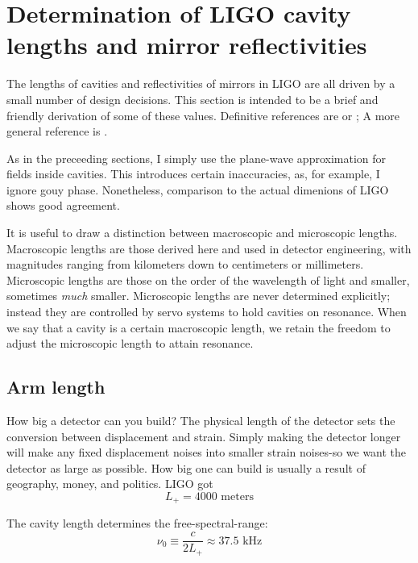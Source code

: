 
\section{Determination of LIGO cavity lengths and mirror reflectivities}

The lengths of cavities and reflectivities of mirrors in LIGO are all
driven by a small number of design decisions.  This section is
intended to be a brief and friendly derivation of some of these
values.  Definitive references are \cite{LigoFreqResponse97} or
\cite{Fritschel2001Readout}; A more general reference is
\cite{S5InstrumentPaper}.

As in the preceeding sections, I simply use the plane-wave
approximation for fields inside cavities. This introduces certain
inaccuracies, as, for example, I ignore gouy phase. Nonetheless,
comparison to the actual dimenions of LIGO shows good agreement.

It is useful to draw a distinction between macroscopic and microscopic
lengths. Macroscopic lengths are those derived here and
used in detector engineering, with magnitudes ranging from kilometers
down to centimeters or millimeters. Microscopic lengths are those
on the order of the wavelength of light and smaller, sometimes \emph{much}
smaller. Microscopic lengths are never determined explicitly; instead
they are controlled by servo systems to hold cavities on resonance.
When we say that a cavity is a certain macroscopic length, we retain
the freedom to adjust the microscopic length to attain resonance.

\subsection*{Arm length}

How big a detector can you build? The physical length of the detector
sets the conversion between displacement and strain. Simply making the
detector longer will make any fixed displacement noises into smaller
strain noises-so we want the detector as large as possible. How big
one can build is usually a result of geography, money, and politics.
LIGO got
%
\begin{equation}
\boxed{{L_{+}=4000\text{{\ meters}}}}
\end{equation}

The cavity length determines the free-spectral-range:
%
\begin{equation}
\nu_0\equiv\frac{c}{2L_{+}}\approx37.5\text{ kHz}
\end{equation}



